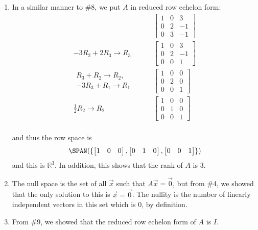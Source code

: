 \begin{example}
\begin{enumerate}
\item In a similar manner to \#8, we put $A$ in reduced row echelon form:
%
\begin{align*}
\qquad & \begin{bmatrix}
1 & 0 & 3 \\
0 & 2 & -1 \\
0 & 3 & -1 
\end{bmatrix} \\
-3 R_2 +2 R_3 \rightarrow R_3 \qquad &
\begin{bmatrix}
1 & 0 & 3 \\
0 & 2 & -1\\
0 & 0 & 1 
\end{bmatrix} \\
\begin{array}{r}
R_3 + R_2 \rightarrow R_2, \\
-3R_3 + R_1 \rightarrow R_1
\end{array} \qquad & 
\begin{bmatrix}
1 & 0 & 0 \\
0 & 2 & 0 \\
0 & 0 & 1 
\end{bmatrix} \\
\frac{1}{2} R_2 \rightarrow R_2 \qquad &
\begin{bmatrix}
1 & 0 & 0 \\
0 & 1 & 0 \\
0 & 0 & 1 
\end{bmatrix} \\
\end{align*}

and thus the row space is
%
\begin{align*}
\SPAN(\{ \begin{bmatrix}
1 & 0 & 0 
\end{bmatrix},\begin{bmatrix}
0 & 1 & 0 
\end{bmatrix},\begin{bmatrix}
0 & 0 & 1
\end{bmatrix} \})
\end{align*}
and this is $\mathbb{R}^3$.  In addition, this shows that the rank of $A$ is 3.  
 
 
\item The null space is the set of all $\vec{x}$ such that $A\vec{x}=\vec{0}$, but from \#4, we showed that the only solution to this is $\vec{x}=\vec{0}$.    The nullity is the number of linearly independent vectors in this set which is 0, by definition. 

\item From \#9, we showed that the reduced row echelon form of $A$ is $I$.  
\end{enumerate}

\end{example}


